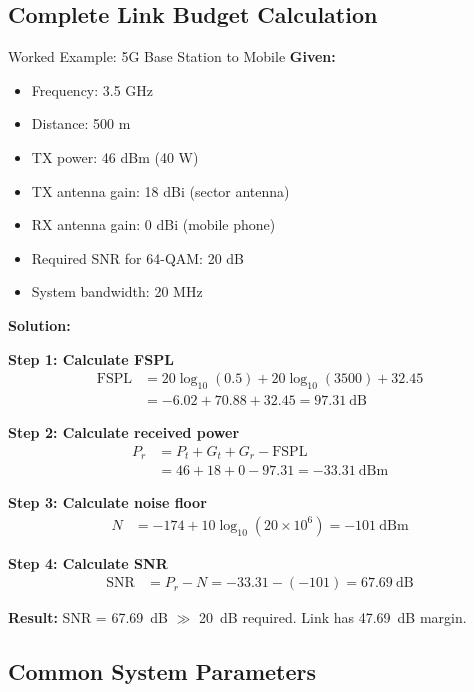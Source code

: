 \subsection{Complete Link Budget Calculation}
\label{subsec:link-budget-example}

\begin{calloutbox}{Worked Example: 5G Base Station to Mobile}
\textbf{Given:}
\begin{itemize}
\item Frequency: 3.5 GHz
\item Distance: 500 m
\item TX power: 46 dBm (40 W)
\item TX antenna gain: 18 dBi (sector antenna)
\item RX antenna gain: 0 dBi (mobile phone)
\item Required SNR for 64-QAM: 20 dB
\item System bandwidth: 20 MHz
\end{itemize}

\textbf{Solution:}

\textbf{Step 1: Calculate FSPL}
\begin{align*}
\text{FSPL} &= 20\log_{10}(0.5) + 20\log_{10}(3500) + 32.45 \\
&= -6.02 + 70.88 + 32.45 = 97.31~\text{dB}
\end{align*}

\textbf{Step 2: Calculate received power}
\begin{align*}
P_r &= P_t + G_t + G_r - \text{FSPL} \\
&= 46 + 18 + 0 - 97.31 = -33.31~\text{dBm}
\end{align*}

\textbf{Step 3: Calculate noise floor}
\begin{align*}
N &= -174 + 10\log_{10}(20 \times 10^6) = -101~\text{dBm}
\end{align*}

\textbf{Step 4: Calculate SNR}
\begin{align*}
\text{SNR} &= P_r - N = -33.31 - (-101) = 67.69~\text{dB}
\end{align*}

\textbf{Result:} SNR = 67.69~dB $\gg$ 20~dB required. Link has 47.69~dB margin.
\end{calloutbox}

\subsection{Common System Parameters}
\label{subsec:common-systems}

